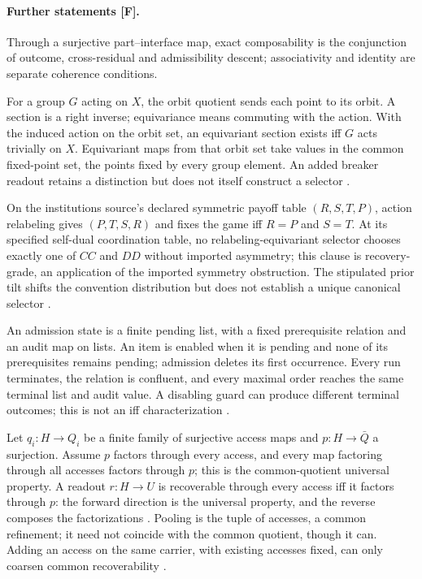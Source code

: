 \documentclass[pdflatex,sn-basic]{sn-jnl}%
\begin{document}
\begin{appendices}
\paragraph{Further statements [F].} Through a surjective part--interface map, exact composability is the conjunction of outcome, cross-residual and admissibility descent; associativity and identity are separate coherence conditions.

For a group $G$ acting on $X$, the orbit quotient sends each point to its orbit. A section is a right inverse; equivariance means commuting with the action. With the induced action on the orbit set, an equivariant section exists iff $G$ acts trivially on $X$. Equivariant maps from that orbit set take values in the common fixed-point set, the points fixed by every group element. An added breaker readout retains a distinction but does not itself construct a selector \citep{tsiokos2026f4}.

On the institutions source's declared symmetric payoff table $(R,S,T,P)$, action relabeling gives $(P,T,S,R)$ and fixes the game iff $R=P$ and $S=T$. At its specified self-dual coordination table, no relabeling-equivariant selector chooses exactly one of $CC$ and $DD$ without imported asymmetry; this clause is recovery-grade, an application of the imported symmetry obstruction. The stipulated prior tilt shifts the convention distribution but does not establish a unique canonical selector \citep{tsiokos2026institutions}.

An admission state is a finite pending list, with a fixed prerequisite relation and an audit map on lists. An item is enabled when it is pending and none of its prerequisites remains pending; admission deletes its first occurrence. Every run terminates, the relation is confluent, and every maximal order reaches the same terminal list and audit value. A disabling guard can produce different terminal outcomes; this is not an iff characterization \citep{tsiokos2026f7}.

Let $q_i:H\to Q_i$ be a finite family of surjective access maps and $p:H\to\bar Q$ a surjection. Assume $p$ factors through every access, and every map factoring through all accesses factors through $p$; this is the common-quotient universal property. A readout $r:H\to U$ is recoverable through every access iff it factors through $p$: the forward direction is the universal property, and the reverse composes the factorizations \citep{tsiokos2026f4}. Pooling is the tuple of accesses, a common refinement; it need not coincide with the common quotient, though it can. Adding an access on the same carrier, with existing accesses fixed, can only coarsen common recoverability \citep{tsiokos2026f8}.

\end{appendices}
\end{document}
